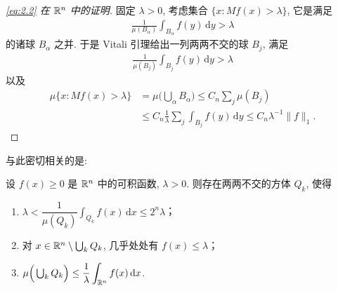\begin{proof}[\eqref{eq:2.2} 在 $\mathbb{R}^n$ 中的证明]
固定 $\lambda > 0$, 考虑集合 $\{x : M f(x) > \lambda\}$, 它是满足
\begin{align*}
  \frac{1}{\mu(B_{\alpha})}\int_{B_{\alpha}}f(y)\,\mathrm{d}y>\lambda
\end{align*}
的诸球 $B_\alpha$ 之并. 于是 Vitali 引理给出一列两两不交的球 $B_{j}$, 满足
\begin{align*}
  \frac{1}{\mu(B_{j})}\int_{B_{j}}f(y)\,\mathrm{d}y>\lambda
\end{align*}
以及
\begin{align*}
  \mu\{x:Mf(x)>\lambda\}
  &=\mu\Big(\bigcup_{\alpha}B_{\alpha}\Big)\leq C_{n}\sum_{j}\mu(B_{j})\\
  &\leq C_{n}\frac{1}{\lambda}\sum_{j}\int_{B_{j}}f(y)\,\mathrm{d}y
  \leq C_{n}\lambda^{-1}\|f\|_{1}.
\end{align*}
\end{proof}

与此密切相关的是:

\begin{lemma}\label{lem:2.3}
设 $f(x) \geq 0$ 是 $\mathbb{R}^n$ 中的可积函数, $\lambda > 0$. 则存在两两不交的方体 $Q_k$, 使得
\begin{enumerate}
\item[(1)] $\lambda<\dfrac{1}{\mu(Q_{k})}\displaystyle\int_{Q_{k}}f(x)\,\mathrm{d}x\leq2^{n}\lambda$；
\item[(2)] 对 $x \in \mathbb{R}^n \setminus \bigcup_k Q_k$, 几乎处处有 $f(x) \leq \lambda$；
\item[(3)] $\mu\Big(\bigcup_{k}Q_{k}\Big)\leq\dfrac{1}{\lambda}\displaystyle\int_{\mathbb{R}^{n}}f(x)\,\mathrm{d}x$.
\end{enumerate}
\end{lemma}

